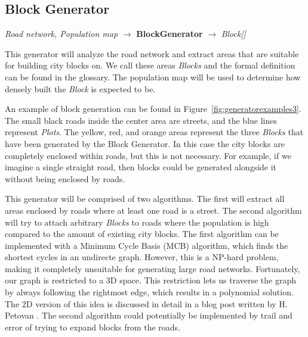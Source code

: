 \subsection{Block Generator}
\begin{center}
    \textit{Road network, Population map} $\rightarrow$ \textbf{BlockGenerator} $\rightarrow$ \textit{Block{[}{]}}
\end{center}
This generator will analyze the road network and extract areas that are suitable for building city blocks on.
We call these areas \textit{Blocks} and the formal definition can be found in the glossary.
The population map will be used to determine how densely built the \textit{Block} is expected to be.

An example of block generation can be found in Figure~\ref{fig:generatorexamples3}.
The small black roads inside the center area are streets, and the blue lines represent \textit{Plots}.
The yellow, red, and orange areas represent the three \textit{Blocks} that have been generated by the Block Generator.
In this case the city blocks are completely enclosed within roads, but this is not necessary.
For example, if we imagine a single straight road, then blocks could be generated alongside it without being enclosed by roads.

This generator will be comprised of two algorithms.
The first will extract all areas enclosed by roads where at least one road is a street.
The second algorithm will try to attach arbitrary \textit{Blocks} to roads where the population is high compared to the amount of existing city blocks.
The first algorithm can be implemented with a Minimum Cycle Basis (MCB) algorithm, which finds the shortest cycles in an undirecte graph.
However, this is a NP-hard problem, making it completely unsuitable for generating large road networks.
Fortunately, our graph is restricted to a 3D space.
This restriction lets us traverse the graph by always following the rightmost edge, which results in a polynomial solution.
The 2D version of this idea is discussed in detail in a blog post written by H. Petovan \cite{mcb}.
The second algorithm could potentially be implemented by trail and error of trying to expand blocks from the roads.